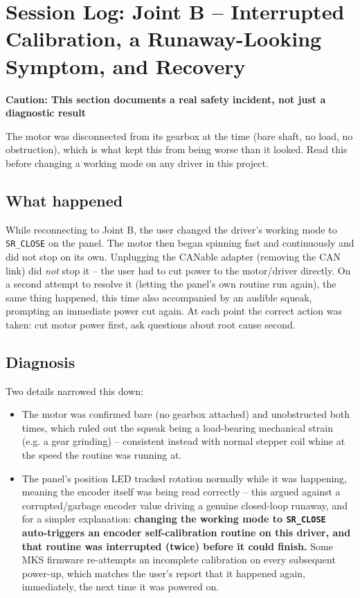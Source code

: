 \documentclass[11pt,letterpaper]{article}
\newenvironment{caution}[1]{%
    \par\addvspace{8pt}%
    \noindent{\color{cautionred}\rule{\linewidth}{0.8pt}}\par\vspace{2pt}
    \noindent\textbf{\color{cautionred}Caution: #1}\par\vspace{2pt}
}{%
    \par\vspace{2pt}\noindent{\color{cautionred}\rule{\linewidth}{0.4pt}}%
    \par\addvspace{8pt}%
}
\begin{document}
\section{Session Log: Joint B -- Interrupted Calibration, a Runaway-Looking Symptom, and Recovery}
\label{sec:session-joint-b-recalibration}

\begin{caution}{This section documents a real safety incident, not just a diagnostic result}
The motor was disconnected from its gearbox at the time (bare shaft, no load, no obstruction), which is what kept this from being worse than it looked. Read this before changing a working mode on any driver in this project.
\end{caution}

\subsection{What happened}
While reconnecting to Joint B, the user changed the driver's working mode to \texttt{SR\_CLOSE} on the panel. The motor then began spinning fast and continuously and did not stop on its own. Unplugging the CANable adapter (removing the CAN link) did \emph{not} stop it -- the user had to cut power to the motor/driver directly. On a second attempt to resolve it (letting the panel's own routine run again), the same thing happened, this time also accompanied by an audible squeak, prompting an immediate power cut again. At each point the correct action was taken: cut motor power first, ask questions about root cause second.

\subsection{Diagnosis}
Two details narrowed this down:
\begin{itemize}
    \item The motor was confirmed bare (no gearbox attached) and unobstructed both times, which ruled out the squeak being a load-bearing mechanical strain (e.g. a gear grinding) -- consistent instead with normal stepper coil whine at the speed the routine was running at.
    \item The panel's position LED tracked rotation normally while it was happening, meaning the encoder itself was being read correctly -- this argued against a corrupted/garbage encoder value driving a genuine closed-loop runaway, and for a simpler explanation: \textbf{changing the working mode to \texttt{SR\_CLOSE} auto-triggers an encoder self-calibration routine on this driver, and that routine was interrupted (twice) before it could finish.} Some MKS firmware re-attempts an incomplete calibration on every subsequent power-up, which matches the user's report that it happened again, immediately, the next time it was powered on.
\end{itemize}
\end{document}
